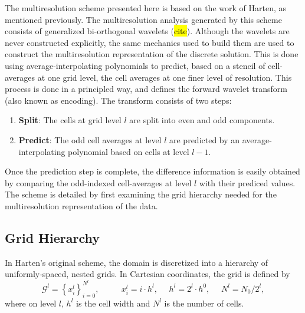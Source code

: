 \documentclass[12pt,letterpaper]{article}
\begin{document}
    The multiresolution scheme presented here is based on the work of Harten, as
    mentioned previously. The multiresolution analysis generated by this scheme
    consists of generalized bi-orthogonal wavelets (\hl{cite}). Although the
    wavelets are never constructed explicitly, the same mechanics used to build
    them are used to construct the multiresolution representation of the
    discrete solution.  This is done using average-interpolating polynomials to
    predict, based on a stencil of cell-averages at one grid level, the cell
    averages at one finer level of resolution. This process is done in a
    principled way, and defines the forward wavelet transform (also known as
    encoding). The transform consists of two steps:
    \begin{enumerate}
        \item[] \textbf{Split}: The cells at grid level $l$ are split into even and odd
                components.
        \item[] \textbf{Predict}: The odd cell averages at level $l$ are predicted
                by an average-interpolating polynomial based on cells at
                level $l-1$.
    \end{enumerate}
    Once the prediction step is complete, the difference information is
    easily obtained by comparing the odd-indexed cell-averages at level $l$ with
    their prediced values. The scheme is detailed by first examining the grid
    hierarchy needed for the multiresolution representation of the data.

    \subsection*{Grid Hierarchy}

        In Harten's original scheme, the domain is discretized into a
        hierarchy of uniformly-spaced, nested grids. In Cartesian
        coordinates, the grid is defined by
        \begin{equation}
            \mathcal{G}^{l} = \left\{ x_{i}^{l} \right\}_{i=0}^{N^{l}}, \text{ }
            \text{ } \text{ } \text{ } x_{i}^{l} = i \cdot h^{l}, \text{ }
            \text{ } h^{l} = 2^{l} \cdot h^{0}, \text{ } \text{ } N^{l} = N_{0}
            / 2^{l},
        \end{equation}
        where on level $l$, $h^{l}$ is the cell width and $N^{l}$ is the number of cells.
\end{document}
